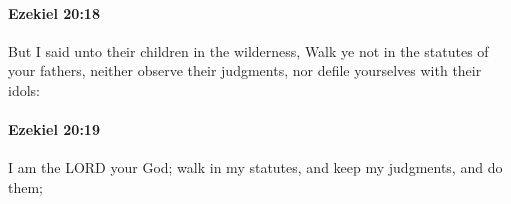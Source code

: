 		\paragraph{Ezekiel 20:18} %
			\label{EZEKIEL-20-18}

			But I said unto their children in the wilderness, Walk ye not in the statutes of your fathers, neither observe their judgments, nor defile yourselves with their idols:


		\paragraph{Ezekiel 20:19} %
			\label{EZEKIEL-20-19}

			I am the LORD your God; walk in my statutes, and keep my judgments, and do them;



